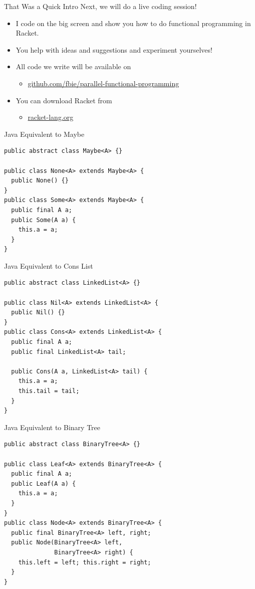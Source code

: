 \documentclass{beamer}
\begin{document}
\begin{frame}{That Was a Quick Intro}
  Next, we will do a live coding session!

  \begin{itemize}
  \pause{} \item I code on the big screen and show you how to do functional programming in Racket.
  \pause{} \item You help with ideas and suggestions and experiment yourselves!
  \pause{} \item All code we write will be available on
  \begin{itemize}
  \item \url{github.com/fbie/parallel-functional-programming}
  \end{itemize}
  \pause{} \item You can download Racket from
  \begin{itemize}
  \item \url{racket-lang.org}
  \end{itemize}
  \end{itemize}
\end{frame}

\begin{frame}[fragile]{Java Equivalent to Maybe}
\begin{lstlisting}[style=Java]
public abstract class Maybe<A> {}

public class None<A> extends Maybe<A> {
  public None() {}
}
public class Some<A> extends Maybe<A> {
  public final A a;
  public Some(A a) {
    this.a = a;
  }
}
\end{lstlisting}
\end{frame}

\begin{frame}[fragile]{Java Equivalent to Cons List}
\begin{lstlisting}[style=Java]
public abstract class LinkedList<A> {}

public class Nil<A> extends LinkedList<A> {
  public Nil() {}
}
public class Cons<A> extends LinkedList<A> {
  public final A a;
  public final LinkedList<A> tail;

  public Cons(A a, LinkedList<A> tail) {
    this.a = a;
    this.tail = tail;
  }
}
\end{lstlisting}
\end{frame}

\begin{frame}[fragile]{Java Equivalent to Binary Tree}
\begin{lstlisting}[style=Java]
public abstract class BinaryTree<A> {}

public class Leaf<A> extends BinaryTree<A> {
  public final A a;
  public Leaf(A a) {
    this.a = a;
  }
}
public class Node<A> extends BinaryTree<A> {
  public final BinaryTree<A> left, right;
  public Node(BinaryTree<A> left,
              BinaryTree<A> right) {
    this.left = left; this.right = right;
  }
}
\end{lstlisting}
\end{frame}
\end{document}
